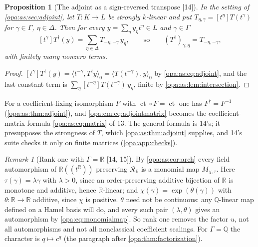 \documentclass[11pt,oneside]{article}
\numberwithin{equation}{section}
\newtheorem{proposition}[proposition]{Proposition}
\theoremstyle{definition}
\theoremstyle{remark}
\newtheorem{remark}[remark]{Remark}
\newcommand{\R}{\mathbb R}
\newcommand{\Q}{\mathbb Q}
\newcommand{\ct}{\operatorname{ct}}
\newcommand{\Hahn}[2]{#1((t^{#2}))}
\newcommand{\coef}[2]{[t^{#1}]#2}
\newcommand{\src}[1]{\textup{\textsf{\small[#1]}}}
\newcommand{\pairing}[2]{\langle #1,#2\rangle_0}
\begin{document}
\begin{proposition}[The adjoint as a sign-reversed transpose \src{14}]\label{opa:cm:prop:adjointmatrix}
In the setting of \cref{opa:as:sec:adjoint}, let $T:K\to L$ be strongly $k$-linear and put
$T_{\eta,\gamma}=\coef\eta{T(t^\gamma)}$ for $\gamma\in\Gamma$, $\eta\in\Delta$. Then for every
$y=\sum_\eta y_\eta t^\eta\in L$ and $\gamma\in\Gamma$
\begin{equation}\label{opa:cm:eq:adjointmatrix}
 \coef\gamma{T^\dagger(y)}=\sum_{\eta\in\Delta}T_{-\eta,-\gamma}\,y_\eta ,\qquad\text{so}\qquad
 (T^\dagger)_{\gamma,\eta}=T_{-\eta,-\gamma},
\end{equation}
with finitely many nonzero terms.
\end{proposition}
\begin{proof}
$\coef\gamma{T^\dagger(y)}=\pairing{t^{-\gamma}}{T^\dagger y}=\pairing{T(t^{-\gamma})}y$ by
\eqref{opa:as:eq:adjoint}, and the last constant term is
$\sum_\eta\coef{-\eta}{T(t^{-\gamma})}\,y_\eta$, finite by \cref{opa:as:lem:intersection}.
\end{proof}

For a coefficient-fixing isomorphism $F$ with $\ct\circ F=\ct$ one has $F^\dagger=F^{-1}$
(\cref{opa:as:thm:adjoint}), and \eqref{opa:cm:eq:adjointmatrix} becomes the coefficient-matrix
formula \eqref{opa:as:eq:matrix} of 13. The general formula is 14's; it presupposes the
strongness of $T$, which \cref{opa:as:thm:adjoint} supplies, and 14's suite checks it only on
finite matrices (\cref{opa:app:checks}).

\begin{remark}[Rank one with $\Gamma=\R$ \src{14, 15}]\label{opa:cm:rem:real}
By \cref{opa:as:cor:arch} every field automorphism of $\Hahn\R\R$ preserving $\mathcal R_\R$ is
a monomial map $M_{\chi,\tau}$. Here $\tau(\gamma)=\lambda\gamma$ with $\lambda>0$, since an
order-preserving additive bijection of $\R$ is monotone and additive, hence $\R$-linear; and
$\chi(\gamma)=\exp(\theta(\gamma))$ with $\theta:\R\to\R$ additive, since $\chi$ is positive.
$\theta$ need not be continuous: any $\Q$-linear map defined on a Hamel basis will do, and
every such pair $(\lambda,\theta)$ gives an automorphism by \eqref{opa:eq:monomialmap}. So
rank one removes the factor $u$, not all automorphisms and not all nonclassical coefficient
scalings. For $\Gamma=\Q$ the character is $q\mapsto c^q$ (the paragraph after
\cref{opa:thm:factorization}).
\end{remark}
\end{document}
